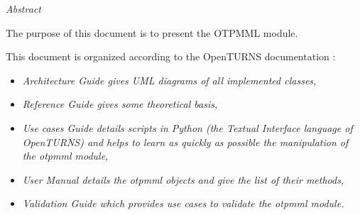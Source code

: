 %  

\vspace{0.5in}
\begin{center}
\vspace{0.3in}
\emph{ Abstract}
\vspace{0.5in}
\end{center}

The purpose of this document is to present the OTPMML module.

This document is organized according to the OpenTURNS documentation :
\begin{itemize}
\item \itshape{Architecture Guide} gives UML diagrams of all implemented classes,
\item \itshape{Reference Guide} gives some theoretical basis,
\item \itshape{Use cases Guide} details scripts in Python (the Textual Interface language of OpenTURNS) and helps to learn as quickly as possible the manipulation of the \textit{otpmml} module,
\item \itshape{User Manual} details the \textit{otpmml} objects and give the list of their methods,
\item \itshape{Validation Guide} which provides use cases to validate the \textit{otpmml} module.
\end{itemize}
